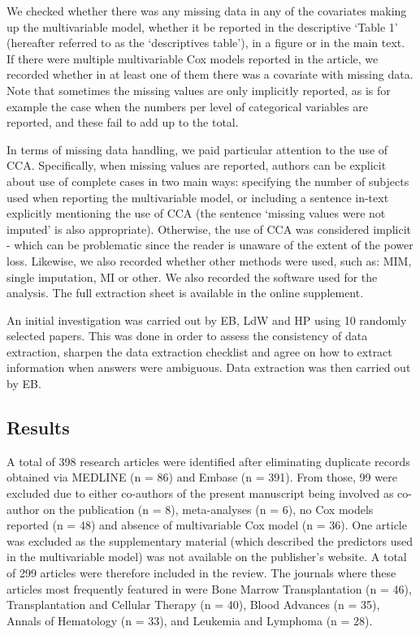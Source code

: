 \documentclass[
  letterpaper,
  DIV=11,
  numbers=noendperiod]{scrreprt}
\begin{document}
We checked whether there was any missing data in any of the covariates
making up the multivariable model, whether it be reported in the
descriptive `Table 1' (hereafter referred to as the `descriptives
table'), in a figure or in the main text. If there were multiple
multivariable Cox models reported in the article, we recorded whether in
at least one of them there was a covariate with missing data. Note that
sometimes the missing values are only implicitly reported, as is for
example the case when the numbers per level of categorical variables are
reported, and these fail to add up to the total.

In terms of missing data handling, we paid particular attention to the
use of CCA. Specifically, when missing values are reported, authors can
be explicit about use of complete cases in two main ways: specifying the
number of subjects used when reporting the multivariable model, or
including a sentence in-text explicitly mentioning the use of CCA (the
sentence `missing values were not imputed' is also appropriate).
Otherwise, the use of CCA was considered implicit - which can be
problematic since the reader is unaware of the extent of the power loss.
Likewise, we also recorded whether other methods were used, such as:
MIM, single imputation, MI or other. We also recorded the software used
for the analysis. The full extraction sheet is available in the online
supplement.

An initial investigation was carried out by EB, LdW and HP using 10
randomly selected papers. This was done in order to assess the
consistency of data extraction, sharpen the data extraction checklist
and agree on how to extract information when answers were ambiguous.
Data extraction was then carried out by EB.

\hypertarget{results}{%
\subsection{Results}\label{results}}

A total of 398 research articles were identified after eliminating
duplicate records obtained via MEDLINE (n = 86) and Embase (n = 391).
From those, 99 were excluded due to either co-authors of the present
manuscript being involved as co-author on the publication (n = 8),
meta-analyses (n = 6), no Cox models reported (n = 48) and absence of
multivariable Cox model (n = 36). One article was excluded as the
supplementary material (which described the predictors used in the
multivariable model) was not available on the publisher's website. A
total of 299 articles were therefore included in the review. The
journals where these articles most frequently featured in were Bone
Marrow Transplantation (n = 46), Transplantation and Cellular Therapy (n
= 40), Blood Advances (n = 35), Annals of Hematology (n = 33), and
Leukemia and Lymphoma (n = 28).
\end{document}
